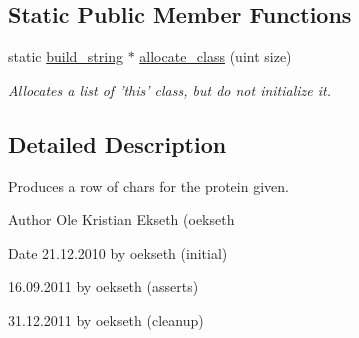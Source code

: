 \subsection*{Static Public Member Functions}
\begin{DoxyCompactItemize}
\item 
\hypertarget{classbuild__string_a5f4c6566dd3c3e865d7241f879bcfe23}{
static \hyperlink{classbuild__string}{build\_\-string} $\ast$ \hyperlink{classbuild__string_a5f4c6566dd3c3e865d7241f879bcfe23}{allocate\_\-class} (uint size)}
\label{classbuild__string_a5f4c6566dd3c3e865d7241f879bcfe23}

\begin{DoxyCompactList}\small\item\em Allocates a list of 'this' class, but do not initialize it. \end{DoxyCompactList}\end{DoxyCompactItemize}


\subsection{Detailed Description}
Produces a row of chars for the protein given. 

\begin{DoxyAuthor}{Author}
Ole Kristian Ekseth (oekseth 
\end{DoxyAuthor}
\begin{DoxyDate}{Date}
21.12.2010 by oekseth (initial) 

16.09.2011 by oekseth (asserts) 

31.12.2011 by oekseth (cleanup) 
\end{DoxyDate}


